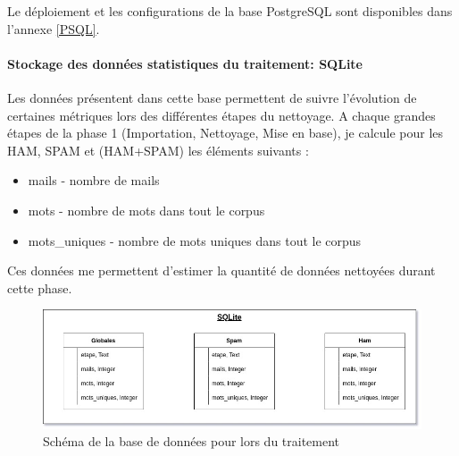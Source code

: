 \documentclass[a4paper,12pt]{article}
\begin{document}
				Le déploiement et les configurations de la base PostgreSQL sont disponibles dans l'annexe \ref{PSQL}.
			
			
			\paragraph{Stockage des données statistiques du traitement: SQLite}
				Les données présentent dans cette base permettent de suivre l'évolution de certaines métriques lors des différentes étapes du nettoyage. 
				A chaque grandes étapes de la phase 1 (Importation, Nettoyage, Mise en base), je calcule pour les HAM, SPAM et (HAM+SPAM) les éléments suivants :
				\begin{itemize}
					\item mails - nombre de mails
					\item mots - nombre de mots dans tout le corpus
					\item mots\_uniques - nombre de mots uniques dans tout le corpus
				\end{itemize}
				
				Ces données me permettent d'estimer la quantité de données nettoyées durant cette phase.
				
				\begin{figure}[H]
					\includegraphics[width=\linewidth]{img/Schemasqlite.jpg}
					\caption{Schéma de la base de données pour lors du traitement}
				\end{figure}
							
			
	
\end{document}
